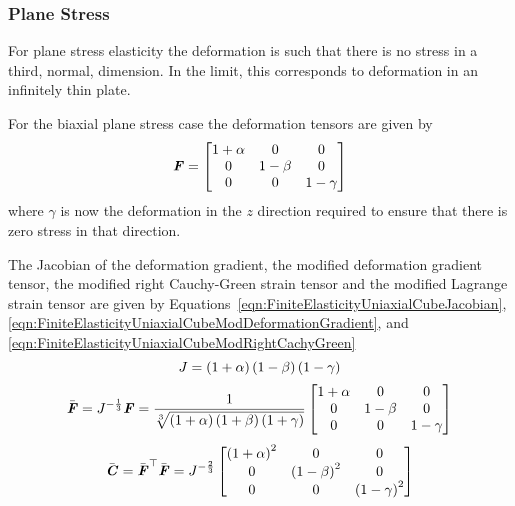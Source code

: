 \subsubsection{Plane Stress}
\label{subsubsec:FiniteElasticityPlaneStress}

For plane stress elasticity the deformation is such that there is no
stress in a third, normal, dimension. In the limit, this corresponds to deformation
in an infinitely thin plate.

For the biaxial plane stress case the deformation tensors are given by
\begin{equation}
  \boldsymbol{\mathit{F}}=\begin{bmatrix}
  1+\alpha & 0 & 0 \\
  0 & 1-\beta & 0 \\
  0 & 0 & 1-\gamma
  \end{bmatrix}  
\end{equation}
where $\gamma$ is now the deformation in the $z$ direction required to ensure that there is zero stress in that direction.

The Jacobian of the deformation gradient, the modified deformation
gradient tensor, the modified right Cauchy-Green strain tensor and the
modified Lagrange strain tensor are given by
Equations~\ref{eqn:FiniteElasticityUniaxialCubeJacobian},\ref{eqn:FiniteElasticityUniaxialCubeModDeformationGradient},
and \ref{eqn:FiniteElasticityUniaxialCubeModRightCachyGreen} \ie
\begin{equation}
  J=\left( 1+\alpha \right)\left( 1-\beta \right)\left( 1-\gamma \right)
\end{equation}
\begin{equation}
  \bar{\boldsymbol{\mathit{F}}}=J^{-\frac{1}{3}}\boldsymbol{\mathit{F}}=\frac{1}{ \sqrt[3]{\left( 1+\alpha \right)\left( 1+\beta \right)\left( 1+\gamma \right)} }\begin{bmatrix}
      1+\alpha & 0 & 0 \\
      0 & 1-\beta & 0 \\
      0 & 0 & 1-\gamma
    \end{bmatrix}
\end{equation}
\begin{equation}
  \bar{\boldsymbol{\mathit{C}}}= {\bar{\boldsymbol{\mathit{F}}}}^{ \top } \bar{\boldsymbol{\mathit{F}}}=J^{-\frac{2}{3}}\begin{bmatrix}
    \left( 1+\alpha \right)^{2} & 0 & 0 \\
    0 & \left( 1-\beta \right)^{2} & 0  \\
    0 & 0 & \left( 1-\gamma \right)^{2}
  \end{bmatrix}
\end{equation}

